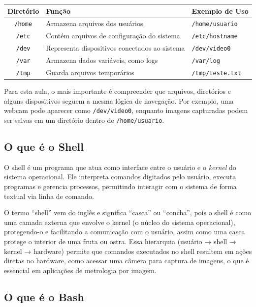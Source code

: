 \documentclass[12pt]{article}
\begin{document}
\begin{cmdbox}
\begin{tabularx}{\linewidth}{@{}C >{\raggedright\arraybackslash}X >{\raggedright\arraybackslash}X@{}}
\toprule
\textbf{Diretório} & \textbf{Função} & \textbf{Exemplo de Uso} \\
\midrule
\texttt{/home} & Armazena arquivos dos usuários & \texttt{/home/usuario} \\
\texttt{/etc} & Contém arquivos de configuração do sistema & \texttt{/etc/hostname} \\
\texttt{/dev} & Representa dispositivos conectados ao sistema & \texttt{/dev/video0} \\
\texttt{/var} & Armazena dados variáveis, como logs & \texttt{/var/log} \\
\texttt{/tmp} & Guarda arquivos temporários & \texttt{/tmp/teste.txt} \\
\bottomrule
\end{tabularx}
\end{cmdbox}

Para esta aula, o mais importante é compreender que arquivos, diretórios e alguns dispositivos seguem a mesma lógica de navegação. Por exemplo, uma webcam pode aparecer como \texttt{/dev/video0}, enquanto imagens capturadas podem ser salvas em um diretório dentro de \texttt{/home/usuario}.

\subsection{O que é o Shell}

O shell é um programa que atua como interface entre o usuário e o \textit{kernel} do sistema operacional. Ele interpreta comandos digitados pelo usuário, executa programas e gerencia processos, permitindo interagir com o sistema de forma textual via linha de comando.

O termo ``shell'' vem do inglês e significa ``casca'' ou ``concha'', pois o shell é como uma camada externa que envolve o kernel (o núcleo do sistema operacional), protegendo-o e facilitando a comunicação com o usuário, assim como uma casca protege o interior de uma fruta ou ostra.
Essa hierarquia (usuário → shell → kernel → hardware) permite que comandos executados no shell resultem em ações diretas no hardware, como acessar uma câmera para captura de imagens, o que é essencial em aplicações de metrologia por imagem.

\subsection{O que é o Bash}
\end{document}
